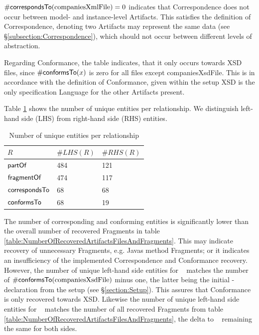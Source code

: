 $\#\textsf{correspondsTo}(\text{companiesXmlFile}) = 0$ indicates that \gls{Correspondence} does not occur between model- and instance-level \glspl{Artifact}.
This satisfies the definition of \gls{Correspondence}, denoting two \glspl{Artifact} may represent the same data (see §\ref{subsection:Correspondence}), which should not occur between different levels of abstraction.

Regarding \gls{Conformance}, the table indicates, that it only occurs towards \gls{XSD} files, since $\#\textsf{conformsTo}(x)$ is zero for all files except companiesXsdFile.
This is in accordance with the definition of \gls{Conformance}, given within the setup \gls{XSD} is the only specification \gls{Language} for the other \glspl{Artifact} present.

Table \ref{table:NumberOfUniqueEntitiesPerRelationship} shows the number of unique entities per relationship.
We distinguish left-hand side (LHS) from right-hand side (RHS) entities.
\begin{table}[h!]
\begin{center}
\begin{tabular}{|l|l|l|}
\hline
$R$ & $\#LHS(R)$ & $\#RHS(R)$
\\ \hline
$\textsf{partOf}$ & 484 & 121
\\ \hline
$\textsf{fragmentOf}$ & 474 & 117
\\ \hline
$\textsf{correspondsTo}$ & 68 & 68
\\ \hline
$\textsf{conformsTo}$ & 68 & 19
\\ \hline 
\end{tabular}
\end{center}
\caption{Number of unique entities per relationship}
\label{table:NumberOfUniqueEntitiesPerRelationship}
\end{table}
The number of corresponding and conforming entities is significantly lower than the overall number of recovered \glspl{Fragment} in table \ref{table:NumberOfRecoveredArtifactsFilesAndFragments}.
This may indicate recovery of unnecessary \glspl{Fragment}, e.g. \glspl{Java} method \glspl{Fragment}; or it indicates an insufficiency of the implemented \gls{Correspondence} and \gls{Conformance} recovery.
However, the number of unique left-hand side entities for \conformsTo~ matches the number of $\#\textsf{conformsTo}(\text{companiesXsdFile})$ minus one, the latter being the initial \conformsTo-declaration from the setup (see §\ref{section:Setup}).
This assures that \gls{Conformance} is only recovered towards \gls{XSD}.
Likewise the number of unique left-hand side entities for \fragmentOf~ matches the number of all recovered \glspl{Fragment} from table \ref{table:NumberOfRecoveredArtifactsFilesAndFragments}, the delta to \partOf~ remaining the same for both sides.